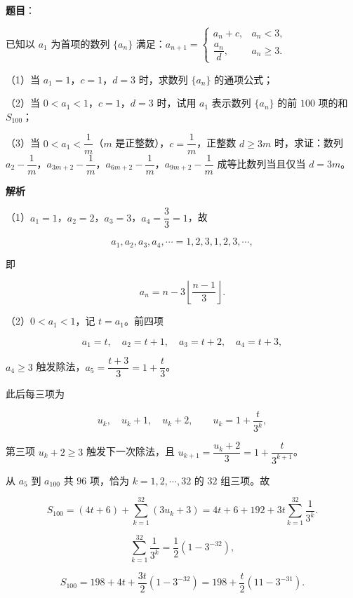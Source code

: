 \begin{answer}

\textbf{题目}：

已知以 $a_1$ 为首项的数列 $\{a_n\}$ 满足：$a_{n+1}=\begin{cases}a_n+c,&a_n<3,\\ \dfrac{a_n}d,&a_n\geqslant3.\end{cases}$

（1）当 $a_1=1$，$c=1$，$d=3$ 时，求数列 $\{a_n\}$ 的通项公式；

（2）当 $0<a_1<1$，$c=1$，$d=3$ 时，试用 $a_1$ 表示数列 $\{a_n\}$ 的前 $100$ 项的和 $S_{100}$；

（3）当 $0<a_1<\dfrac1m$（$m$ 是正整数），$c=\dfrac1m$，正整数 $d\geqslant3m$ 时，求证：数列 $a_2-\dfrac1m$，$a_{3m+2}-\dfrac1m$，$a_{6m+2}-\dfrac1m$，$a_{9m+2}-\dfrac1m$ 成等比数列当且仅当 $d=3m$。

\textbf{解析}

（1）$a_1=1$，$a_2=2$，$a_3=3$，$a_4=\dfrac33=1$，故

\nopagebreak[4]
\[a_1,a_2,a_3,a_4,\cdots=1,2,3,1,2,3,\cdots,\]

即

\nopagebreak[4]
\[a_n=n-3\left\lfloor\frac{n-1}3\right\rfloor.\]

（2）$0<a_1<1$，记 $t=a_1$。前四项

\nopagebreak[4]
\[a_1=t,\quad a_2=t+1,\quad a_3=t+2,\quad a_4=t+3,\]

$a_4\geqslant3$ 触发除法，$a_5=\dfrac{t+3}3=1+\dfrac t3$。

此后每三项为

\nopagebreak[4]
\[u_k,\quad u_k+1,\quad u_k+2,\qquad u_k=1+\frac t{3^k},\]

第三项 $u_k+2\geqslant3$ 触发下一次除法，且 $u_{k+1}=\dfrac{u_k+2}3=1+\dfrac t{3^{k+1}}$。

从 $a_5$ 到 $a_{100}$ 共 $96$ 项，恰为 $k=1,2,\cdots,32$ 的 $32$ 组三项。故

\nopagebreak[4]
\[S_{100}=(4t+6)+\sum_{k=1}^{32}\left(3u_k+3\right)
=4t+6+192+3t\sum_{k=1}^{32}\frac1{3^k}.\]

\nopagebreak[4]
\[\sum_{k=1}^{32}\frac1{3^k}=\frac12\left(1-3^{-32}\right),\]

\nopagebreak[4]
\[S_{100}=198+4t+\frac{3t}2\left(1-3^{-32}\right)=198+\frac t2\left(11-3^{-31}\right).\]


\end{answer}
